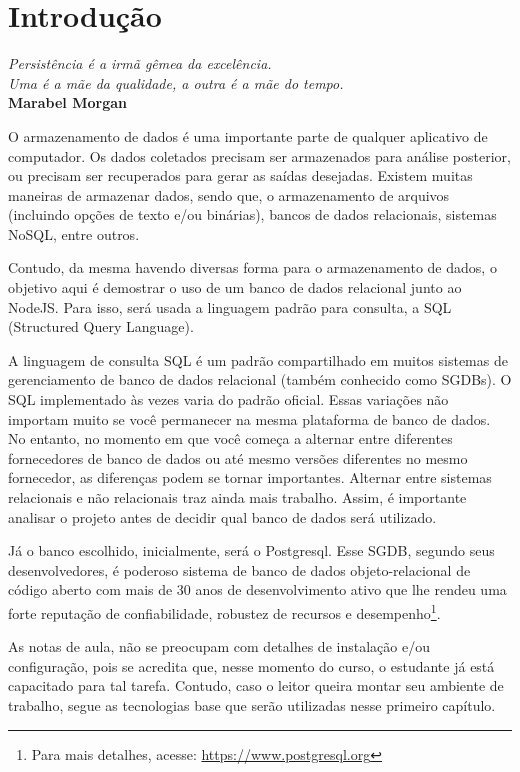 \chapter{Introdução}\label{cap:cap1}

\begin{flushright}
  \textit{
    Persistência é a irmã gêmea da excelência. \\
    Uma é a mãe da qualidade, a outra é a mãe do tempo.
  } \\
  
  \textbf{Marabel Morgan}
\end{flushright}

O armazenamento de dados é uma importante parte de qualquer aplicativo de computador. Os dados coletados precisam ser armazenados para análise posterior, ou precisam ser recuperados para gerar as saídas desejadas. Existem muitas maneiras de armazenar dados, sendo que, o armazenamento de arquivos (incluindo opções de texto e/ou binárias), bancos de dados relacionais, sistemas NoSQL, entre outros.

Contudo, da mesma havendo diversas forma para o armazenamento de dados, o objetivo aqui é demostrar o uso de um banco de dados relacional junto ao NodeJS. Para isso, será usada a linguagem padrão para consulta, a SQL (Structured Query Language). 

A linguagem de consulta SQL é um padrão compartilhado em muitos sistemas de gerenciamento de banco de dados relacional (também conhecido como SGDBs). O SQL implementado às vezes varia do padrão oficial. Essas variações não importam muito se você permanecer na mesma plataforma de banco de dados. No entanto, no momento em que você começa a alternar entre diferentes fornecedores de banco de dados ou até mesmo versões diferentes no mesmo fornecedor, as diferenças podem se tornar importantes. Alternar entre sistemas relacionais e não relacionais traz ainda mais trabalho. Assim, é importante analisar o projeto antes de decidir qual banco de dados será utilizado. 

Já o banco escolhido, inicialmente, será o Postgresql. Esse SGDB, segundo seus desenvolvedores, é poderoso sistema de banco de dados objeto-relacional de código aberto com mais de 30 anos de desenvolvimento ativo que lhe rendeu uma forte reputação de confiabilidade, robustez de recursos e desempenho\footnote{Para mais detalhes, acesse: \url{https://www.postgresql.org}}. 

As notas de aula, não se preocupam com detalhes de instalação e/ou configuração, pois se acredita que, nesse momento do curso, o estudante já está capacitado para tal tarefa. Contudo, caso o leitor queira montar seu ambiente de trabalho, segue as tecnologias base que serão utilizadas nesse primeiro capítulo.

